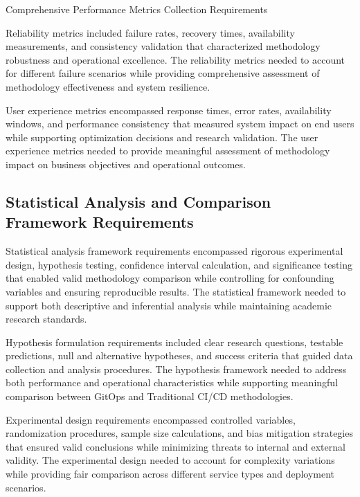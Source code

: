 \begin{table}[H]
\centering
\caption{Comprehensive Performance Metrics Collection Requirements}
\label{tab:performance-metrics-collection}
\end{table}

Reliability metrics included failure rates, recovery times, availability measurements, and consistency validation that characterized methodology robustness and operational excellence. The reliability metrics needed to account for different failure scenarios while providing comprehensive assessment of methodology effectiveness and system resilience.

User experience metrics encompassed response times, error rates, availability windows, and performance consistency that measured system impact on end users while supporting optimization decisions and research validation. The user experience metrics needed to provide meaningful assessment of methodology impact on business objectives and operational outcomes.

\subsection{Statistical Analysis and Comparison Framework Requirements}

Statistical analysis framework requirements encompassed rigorous experimental design, hypothesis testing, confidence interval calculation, and significance testing that enabled valid methodology comparison while controlling for confounding variables and ensuring reproducible results. The statistical framework needed to support both descriptive and inferential analysis while maintaining academic research standards.

Hypothesis formulation requirements included clear research questions, testable predictions, null and alternative hypotheses, and success criteria that guided data collection and analysis procedures. The hypothesis framework needed to address both performance and operational characteristics while supporting meaningful comparison between GitOps and Traditional CI/CD methodologies.

Experimental design requirements encompassed controlled variables, randomization procedures, sample size calculations, and bias mitigation strategies that ensured valid conclusions while minimizing threats to internal and external validity. The experimental design needed to account for complexity variations while providing fair comparison across different service types and deployment scenarios.

